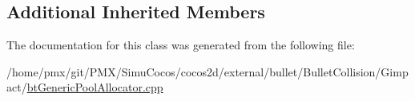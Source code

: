 \subsection*{Additional Inherited Members}


The documentation for this class was generated from the following file\+:\begin{DoxyCompactItemize}
\item 
/home/pmx/git/\+P\+M\+X/\+Simu\+Cocos/cocos2d/external/bullet/\+Bullet\+Collision/\+Gimpact/\hyperlink{btGenericPoolAllocator_8cpp}{bt\+Generic\+Pool\+Allocator.\+cpp}\end{DoxyCompactItemize}
